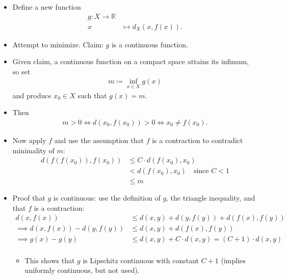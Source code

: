 \begin{solution}

\envlist

\begin{itemize}
\item
  Define a new function
  \begin{align*}     g: X \to {\mathbb{R}}\\     x &\mapsto d_X(x, f(x))     .\end{align*}
\item
  Attempt to minimize. Claim: \(g\) is a continuous function.
\item
  Given claim, a continuous function on a compact space attains its
  infimum, so set
  \begin{align*}       m \coloneqq\inf_{x\in X} g(x)        \end{align*}
  and produce \(x_0\in X\) such that \(g(x) = m\).
\item
  Then
  \begin{align*}     m> 0 \iff d(x_0, f(x_0)) > 0 \iff x_0 \neq f(x_0)     .\end{align*}
\item
  Now apply \(f\) and use the assumption that \(f\) is a contraction to
  contradict minimality of \(m\):
  \begin{align*}     d(f(f(x_0)), f(x_0))      &\leq C\cdot d(f(x_0), x_0) \\      &< d(f(x_0), x_0) \quad\text{since } C<1\\     &\leq m     \end{align*}
\item
  Proof that \(g\) is continuous: use the definition of \(g\), the
  triangle inequality, and that \(f\) is a contraction:
  \begin{align*}     d(x, f(x)) &\leq d(x, y) + d(y, f(y)) + d(f(x), f(y)) \\     \implies d(x, f(x)) - d(y, f(y)) &\leq d(x, y) + d(f(x), f(y)) \\     \implies g(x) - g(y) &\leq d(x, y) + C\cdot d(x, y)  = (C+1) \cdot d(x, y)\\     \end{align*}

  \begin{itemize}
  \tightlist
  \item
    This shows that \(g\) is Lipschitz continuous with constant \(C+1\)
    (implies uniformly continuous, but not used).
  \end{itemize}
\end{itemize}

\end{solution}

